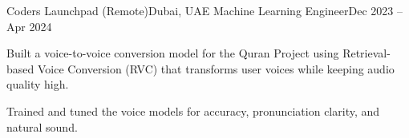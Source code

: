 \resumeSubheading
  {Coders Launchpad (Remote)}{Dubai, UAE}
  {Machine Learning Engineer}{Dec 2023 -- Apr 2024}
  \resumeItemListStart
    \item \small{Built a voice-to-voice conversion model for the Quran Project using Retrieval-based Voice Conversion (RVC) that transforms user voices while keeping audio quality high.}
    \item \small{Trained and tuned the voice models for accuracy, pronunciation clarity, and natural sound.}
  \resumeItemListEnd
